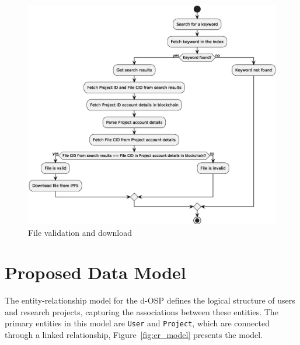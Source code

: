 \documentclass[final]{rc-book-2.14}
\begin{document}
\begin{figure}[htbp]
    \centering
    \includegraphics[scale=0.5]{fig/keyword_and_file_validation.eps}
    \caption{File validation and download}
    \label{fig:c4_file_validation}
\end{figure}


\section{Proposed Data Model}
\label{chp:proposed_model:sec:data_model}

The entity-relationship model for the d-OSP defines the logical structure of users and research projects, capturing the associations between these entities. The primary entities in this model are \texttt{User} and \texttt{Project}, which are connected through a linked relationship, Figure~\ref{fig:er_model} presents the model.
\end{document}
